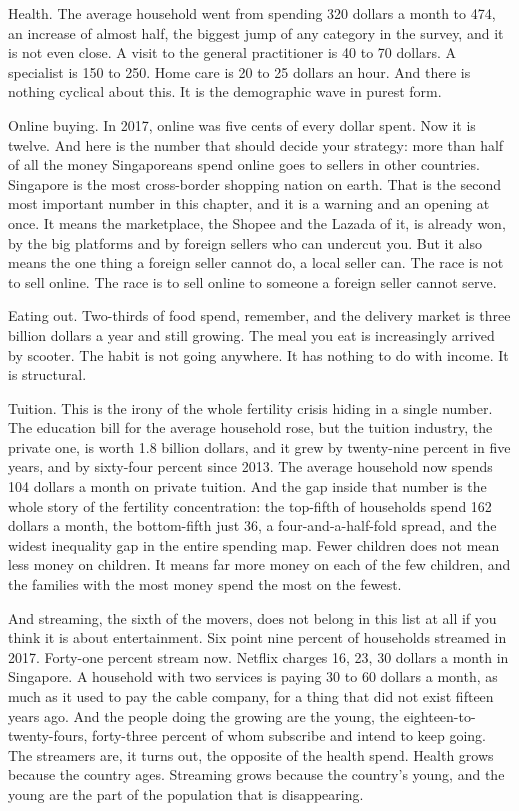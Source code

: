 \documentclass[10pt,twoside,openany]{memoir}
\begin{document}
{{{{{{{{{{{{{{{{{Health. The average household went from spending 320 dollars a month to
474, an increase of almost half, the biggest jump of any category in the
survey, and it is not even close. A visit to the general practitioner is
40 to 70 dollars. A specialist is 150 to 250. Home care is 20 to 25
dollars an hour. And there is nothing cyclical about this. It is the
demographic wave in purest form.

Online buying. In 2017, online was five cents of every dollar spent. Now
it is twelve. And here is the number that should decide your strategy:
more than half of all the money Singaporeans spend online goes to
sellers in other countries. Singapore is the most cross-border shopping
nation on earth. That is the second most important number in this
chapter, and it is a warning and an opening at once. It means the
marketplace, the Shopee and the Lazada of it, is already won, by the big
platforms and by foreign sellers who can undercut you. But it also means
the one thing a foreign seller cannot do, a local seller can. The race
is not to sell online. The race is to sell online to someone a foreign
seller cannot serve.

Eating out. Two-thirds of food spend, remember, and the delivery market
is three billion dollars a year and still growing. The meal you eat is
increasingly arrived by scooter. The habit is not going anywhere. It has
nothing to do with income. It is structural.

Tuition. This is the irony of the whole fertility crisis hiding in a
single number. The education bill for the average household rose, but
the tuition industry, the private one, is worth 1.8 billion dollars, and
it grew by twenty-nine percent in five years, and by sixty-four percent
since 2013. The average household now spends 104 dollars a month on
private tuition. And the gap inside that number is the whole story of
the fertility concentration: the top-fifth of households spend 162
dollars a month, the bottom-fifth just 36, a four-and-a-half-fold
spread, and the widest inequality gap in the entire spending map. Fewer
children does not mean less money on children. It means far more money
on each of the few children, and the families with the most money spend
the most on the fewest.

And streaming, the sixth of the movers, does not belong in this list at
all if you think it is about entertainment. Six point nine percent of
households streamed in 2017. Forty-one percent stream now. Netflix
charges 16, 23, 30 dollars a month in Singapore. A household with two
services is paying 30 to 60 dollars a month, as much as it used to pay
the cable company, for a thing that did not exist fifteen years ago. And
the people doing the growing are the young, the
eighteen-to-twenty-fours, forty-three percent of whom subscribe and
intend to keep going. The streamers are, it turns out, the opposite of
the health spend. Health grows because the country ages. Streaming grows
because the country's young, and the young are the part of the
population that is disappearing.

}}}}}}}}}}}}}}}}}
\end{document}
